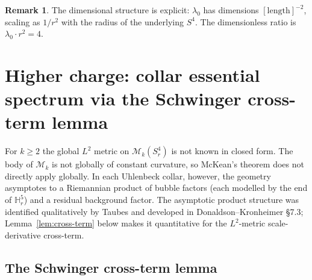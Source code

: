 \documentclass[11pt,letterpaper]{article}
\theoremstyle{definition}
\newtheorem{remark}[theorem]{Remark}
\newcommand{\bbH}{\mathbb{H}}
\newcommand{\cM}{\mathcal{M}}
\begin{document}
\begin{remark}\label{rmk:radius-units}
The dimensional structure is explicit: $\lambda_0$ has dimensions $[\mathrm{length}]^{-2}$, scaling as $1/r^2$ with the radius of the underlying $S^4$. The dimensionless ratio is $\lambda_0 \cdot r^2 = 4$.
\end{remark}

\section{Higher charge: collar essential spectrum via the Schwinger cross-term lemma}\label{sec:collar}

For $k \ge 2$ the global $L^2$ metric on $\cM_k(S^4_r)$ is not known in closed form. The body of $\cM_k$ is not globally of constant curvature, so McKean's theorem does not directly apply globally. In each Uhlenbeck collar, however, the geometry asymptotes to a Riemannian product of bubble factors (each modelled by the end of $\bbH^5_r$) and a residual background factor. The asymptotic product structure was identified qualitatively by Taubes \cite{Taubes1988} and developed in Donaldson--Kronheimer \cite{DK1990} \S 7.3; Lemma~\ref{lem:cross-term} below makes it quantitative for the $L^2$-metric scale-derivative cross-term.

\subsection{The Schwinger cross-term lemma}
\end{document}
